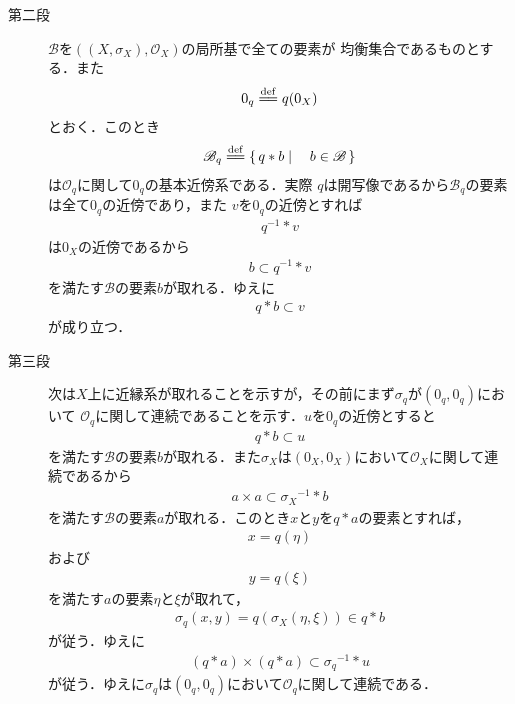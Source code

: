 \begin{sketch}
\begin{description}
			\item[第二段]
				$\mathscr{B}$を$\left((X,\sigma_X),\mathscr{O}_X\right)$の局所基で全ての要素が
				均衡集合であるものとする．また
				\begin{align}
					0_q \defeq q(0_X)
				\end{align}
				とおく．このとき
				\begin{align}
					\mathscr{B}_q \defeq \Set{q \ast b}{b \in \mathscr{B}}
				\end{align}
				は$\mathscr{O}_q$に関して$0_q$の基本近傍系である．実際
				$q$は開写像であるから$\mathscr{B}_q$の要素は全て$0_q$の近傍であり，また
				$v$を$0_q$の近傍とすれば
				\begin{align}
					q^{-1} \ast v
				\end{align}
				は$0_X$の近傍であるから
				\begin{align}
					b \subset q^{-1} \ast v
				\end{align}
				を満たす$\mathscr{B}$の要素$b$が取れる．ゆえに
				\begin{align}
					q \ast b \subset v
				\end{align}
				が成り立つ．
				
			\item[第三段]
				次は$X$上に近縁系が取れることを示すが，その前にまず$\sigma_q$が$(0_q,0_q)$において
				$\mathscr{O}_q$に関して連続であることを示す．$u$を$0_q$の近傍とすると
				\begin{align}
					q \ast b \subset u
				\end{align}
				を満たす$\mathscr{B}$の要素$b$が取れる．また$\sigma_X$は$(0_X,0_X)$において$\mathscr{O}_X$に関して連続であるから
				\begin{align}
					a \times a \subset {\sigma_X}^{-1} \ast b
				\end{align}
				を満たす$\mathscr{B}$の要素$a$が取れる．このとき$x$と$y$を$q \ast a$の要素とすれば，
				\begin{align}
					x = q(\eta)
				\end{align}
				および
				\begin{align}
					y = q(\xi)
				\end{align}
				を満たす$a$の要素$\eta$と$\xi$が取れて，
				\begin{align}
					\sigma_q(x,y) = q\left(\sigma_X(\eta,\xi)\right) \in q \ast b
				\end{align}
				が従う．ゆえに
				\begin{align}
					(q \ast a) \times (q \ast a) \subset {\sigma_q}^{-1} \ast u
				\end{align}
				が従う．ゆえに$\sigma_q$は$(0_q,0_q)$において$\mathscr{O}_q$に関して連続である．
				

\end{description}
\end{sketch}
